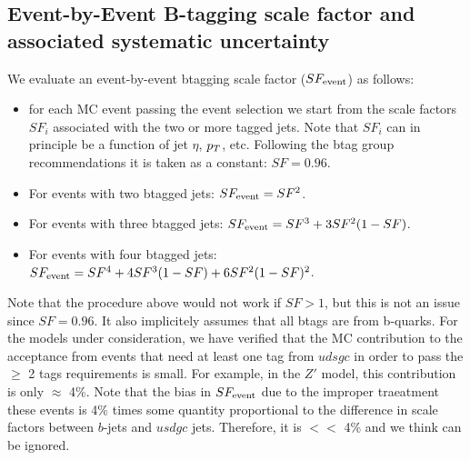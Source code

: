 \subsection{Event-by-Event B-tagging scale factor and associated systematic uncertainty}
We evaluate an event-by-event btagging scale factor ($SF_{\rm event}$) as follows:

\begin{itemize}
\item for each MC event passing the event selection we start
from the scale factors $SF_i$ associated with the two or more
tagged jets.  Note that $SF_i$ can in principle be a function 
of jet $\eta$, $p_T$, etc.  Following the btag group 
recommendations
it is taken as a constant: $SF=0.96$\cite{BTVPAS2011,btvSyst}.

\item For events with two btagged jets: $SF_{\rm event}=SF^2$.

\item For events with three btagged jets: $SF_{\rm event}=SF^3 + 3SF^2(1-SF)$.

\item For events with four btagged jets: $SF_{\rm event}=SF^4 + 4SF^3(1-SF) + 6SF^2(1-SF)^2$.
\end{itemize}

Note that the procedure above would not work if $SF>1$, but this is not an issue
since $SF=0.96$.
It also implicitely assumes that all btags are from b-quarks.  For the models under 
consideration, we have verified that the MC contribution to the acceptance from 
events that need at least one tag from $udsgc$ in order to pass the $\ge$ 2 tags 
requirements is small.  For example, in the $Z'$ model, this contribution is
only $\approx$ 4\%.  Note that the bias in $SF_{\rm event}$ due to the improper traeatment
these events is 4\% times some quantity proportional to the difference in scale 
factors between $b$-jets and $usdgc$ jets.  Therefore, it is $<<$ 4\% and we think
can be ignored.  

